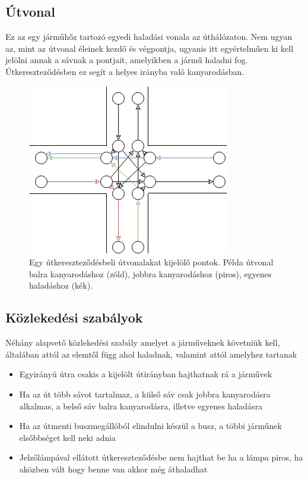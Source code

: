 \subsection{Útvonal}
Ez az egy járműhőz tartozó egyedi haladási vonala az úthálózaton. Nem ugyan az, mint az útvonal éleinek kezdő és végpontja, ugyanis itt egyértelműen ki kell jelölni annak a sávnak a pontjait, amelyikben a jármű haladni fog. Útkereszteződésben ez segít a helyes irányba való kanyarodásban.
\begin{figure}[H]
\includegraphics[width=\linewidth]{ut.png}
\caption{Egy útkereszteződésbeli útvonalakat kijelölő pontok. Példa útvonal balra kanyarodáshoz (zöld), jobbra kanyarodáshoz (piros), egyenes haladáshoz (kék).}
\label{fig:path}
\end{figure}
\subsection{Közlekedési szabályok}
Néhány alapvető közlekedési szabály amelyet a járműveknek követniük kell, általában attól az elemtől függ ahol haladnak, valamint attól amelyhez tartanak
\begin{itemize}
\item Egyirányú útra csakis a kijelölt útirányban hajthatnak rá a járművek
\item Ha az út több sávot tartalmaz, a külső sáv csak jobbra kanyarodásra alkalmas, a belső sáv balra kanyarodásra, illetve egyenes haladásra
\item Ha az útmenti buszmegállóból elindulni készül a busz, a többi járműnek elsőbbséget kell neki adnia
\item Jelzőlámpával ellátott útkereszteződésbe nem hajthat be ha a lámpa piros, ha aközben vált hogy benne van akkor még áthaladhat
\end{itemize}

